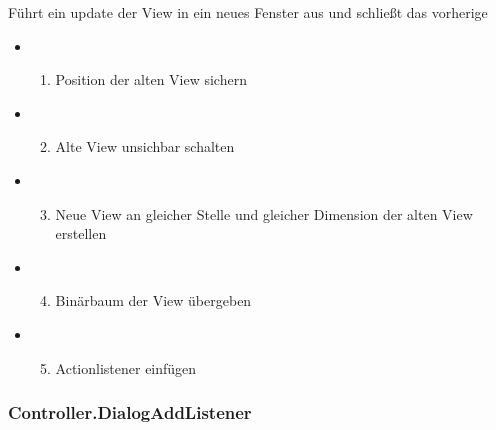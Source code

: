 \documentclass[letterpaper,10pt,ngerman]{sphinxmanual}
\begin{document}
\begin{fulllineitems}
\label{\detokenize{com/linuxluigi/edu/Controller:com.linuxluigi.edu.Controller.updateViewInNewWindow()}}
Führt ein update der View in ein neues Fenster aus und schließt das vorherige
\begin{itemize}
\item {} \begin{enumerate}
\item {} 
Position der alten View sichern

\end{enumerate}

\item {} \begin{enumerate}
\setcounter{enumi}{1}
\item {} 
Alte View unsichbar schalten

\end{enumerate}

\item {} \begin{enumerate}
\setcounter{enumi}{2}
\item {} 
Neue View an gleicher Stelle und gleicher Dimension der alten View erstellen

\end{enumerate}

\item {} \begin{enumerate}
\setcounter{enumi}{3}
\item {} 
Binärbaum der View übergeben

\end{enumerate}

\item {} \begin{enumerate}
\setcounter{enumi}{4}
\item {} 
Actionlistener einfügen

\end{enumerate}

\end{itemize}

\end{fulllineitems}



\subsubsection{Controller.DialogAddListener}
\label{\detokenize{com/linuxluigi/edu/Controller-DialogAddListener::doc}}\label{\detokenize{com/linuxluigi/edu/Controller-DialogAddListener:controller-dialogaddlistener}}
\end{document}

